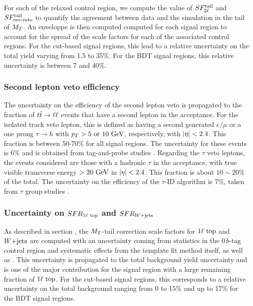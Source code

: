             For each of the relaxed control region, we compute the value of $SF_{2\ell}^{\text{tail}}$ 
            and $SF_{\text{rev-veto}}^{\text{tail}}$ to quantify the agreement between data and the simulation in 
            the tail of $M_T$. An enveloppe is then computed computed for each signal 
            region to account for the spread of the scale factors for each of the 
            associated control regions. For the cut-based signal regions, this lead to a 
            relative uncertainty on the total yield varying from 1.5 to 35\%. For the 
            BDT signal regions, this relative uncertainty is between 7 and 40\%.

            \subsubsection{Second lepton veto efficiency}

            The uncertainty on the efficiency of the second lepton veto is propagated to the
            fraction of $t\bar{t} \rightarrow \ell \ell$ events that have a second lepton in the acceptance. For
            the isolated track veto lepton, this is defined as having a second generated 
            $e/\mu$ or a one prong $\tau \rightarrow h$ with $p_T > 5 \text{ or } 10 ~\text{GeV}$, 
            respectively, with $\left| \eta \right| < 2.4$. This fraction is between 50-70\% for all
            signal regions. The uncertainty for these events is 6\% and is obtained from 
            tag-and-probe studies . Regarding the $\tau$ veto leptons, the 
            events considered are those with a hadronic $\tau$ in the acceptance, with 
            true visible transverse energy $> 20~\text{GeV}$ in $\left| \eta \right| < 2.4$. This fraction is
            about $10 \sim 20 \%$ of the total. The uncertainty on the efficiency of the 
            $\tau$-ID algorithm is 7\%, taken from $\tau$ group studies .

            \subsubsection{Uncertainty on $SFR_{1\ell~\text{top}}$ and $SFR_{\text{$W$+jets}}$}

            As described in section \label{sec:MTtailCorrection}, the $M_T$-tail correction
            scale factors for $1\ell~\text{top}$ and $\text{$W$+jets}$ are computed with an uncertainty
            coming from statistics in the $0\, b\text{-tag}$ control region and systematic effects
            from the template fit method itself, as well as . This uncertainty is propagated
            to the total background yield uncertainty and is one of the major contribution 
            for the signal region with a large remaining fraction of $1\ell~\text{top}$.
            For the cut-based signal regions, this corresponds to a relative uncertainty 
            on the total background ranging from 0 to 15\% and up to 17\% for the BDT
            signal regions.

